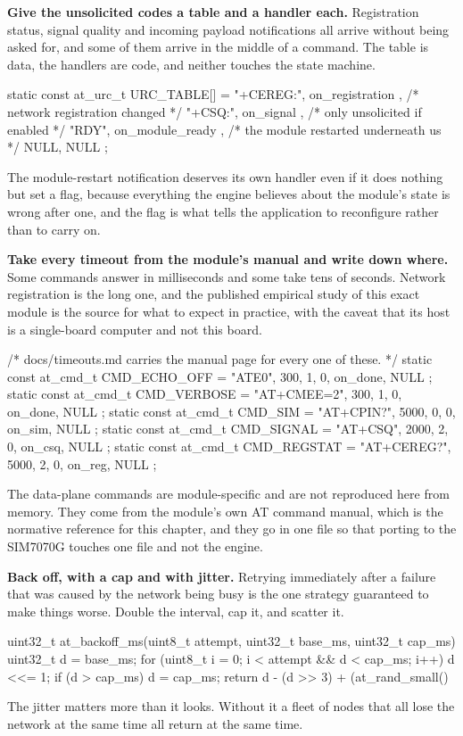 \begin{steps}
\item \textbf{Give the unsolicited codes a table and a handler each.} Registration
status, signal quality and incoming payload notifications all arrive without
being asked for, and some of them arrive in the middle of a command. The table
is data, the handlers are code, and neither touches the state machine.
\begin{ccode}
static const at_urc_t URC_TABLE[] = {
    { "+CEREG:",  on_registration },   /* network registration changed      */
    { "+CSQ:",    on_signal       },   /* only unsolicited if enabled       */
    { "RDY",      on_module_ready },   /* the module restarted underneath us */
    { NULL,       NULL }
};
\end{ccode}
The module-restart notification deserves its own handler even if it does nothing
but set a flag, because everything the engine believes about the module's state
is wrong after one, and the flag is what tells the application to reconfigure
rather than to carry on.

\item \textbf{Take every timeout from the module's manual and write down where.}
Some commands answer in milliseconds and some take tens of seconds. Network
registration is the long one, and the published empirical study of this exact
module is the source for what to expect in practice, with the caveat that its
host is a single-board computer and not this board.
\begin{ccode}
/* docs/timeouts.md carries the manual page for every one of these.          */
static const at_cmd_t CMD_ECHO_OFF = { "ATE0",     300,  1, 0, on_done, NULL };
static const at_cmd_t CMD_VERBOSE  = { "AT+CMEE=2", 300, 1, 0, on_done, NULL };
static const at_cmd_t CMD_SIM      = { "AT+CPIN?",  5000, 0, 0, on_sim,  NULL };
static const at_cmd_t CMD_SIGNAL   = { "AT+CSQ",    2000, 2, 0, on_csq,  NULL };
static const at_cmd_t CMD_REGSTAT  = { "AT+CEREG?", 5000, 2, 0, on_reg,  NULL };
\end{ccode}
The data-plane commands are module-specific and are not reproduced here from
memory. They come from the module's own AT command manual, which is the
normative reference for this chapter, and they go in one file so that porting to
the SIM7070G touches one file and not the engine.

\item \textbf{Back off, with a cap and with jitter.} Retrying immediately after a
failure that was caused by the network being busy is the one strategy guaranteed
to make things worse. Double the interval, cap it, and scatter it.
\begin{ccode}
uint32_t at_backoff_ms(uint8_t attempt, uint32_t base_ms, uint32_t cap_ms)
{
    uint32_t d = base_ms;
    for (uint8_t i = 0; i < attempt && d < cap_ms; i++) d <<= 1;
    if (d > cap_ms) d = cap_ms;
    return d - (d >> 3) + (at_rand_small() %
}
\end{ccode}
The jitter matters more than it looks. Without it a fleet of nodes that all lose
the network at the same time all return at the same time.


\end{steps}
